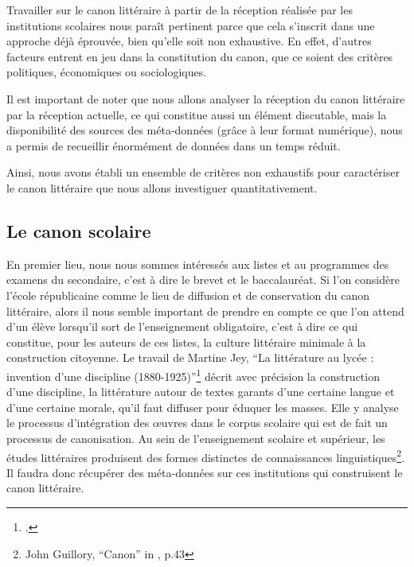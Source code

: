 Travailler sur le canon littéraire à partir de la réception réalisée par les institutions scolaires nous paraît pertinent parce que cela s'inscrit dans une approche déjà éprouvée, bien qu'elle soit non exhaustive. En effet, d'autres facteurs entrent en jeu dans la constitution du canon, que ce soient des critères politiques, économiques ou sociologiques.

Il est important de noter que nous allons analyser la réception du canon littéraire par la réception actuelle, ce qui constitue aussi un élément discutable, mais la disponibilité des sources des méta-données (grâce à leur format numérique), nous a permis de recueillir énormément de données dans un temps réduit. 

Ainsi, nous avons établi un ensemble de critères non exhaustifs pour caractériser le canon littéraire que nous allons investiguer quantitativement.

\subsection{Le canon scolaire}

En premier lieu, nous nous sommes intéressés aux listes et au programmes des examens du secondaire, c'est à dire le brevet et le baccalauréat. Si l'on considère l'école républicaine comme le lieu de diffusion et de conservation du canon littéraire, alors il nous semble important de prendre en compte ce que l'on attend d'un élève lorsqu'il sort de l'enseignement obligatoire, c'est à dire ce qui constitue, pour les auteurs de ces listes, la culture littéraire minimale à la construction citoyenne. Le travail de Martine Jey, \enquote{La littérature au lycée : invention d’une discipline (1880-1925)}\footcites{jey_litterature_1998} décrit avec précision la construction d'une discipline, la littérature autour de textes garants d'une certaine langue et d'une certaine morale, qu'il faut diffuser pour éduquer les masses. Elle y analyse le processus d'intégration des œuvres dans le corpus scolaire qui est de fait un processus de canonisation. Au sein de l'enseignement scolaire et supérieur, les études littéraires produisent des formes distinctes de connaissances linguistiques\footnote{John Guillory, \enquote{Canon} in \cite{lentricchia_critical_2012},  p.43}. Il faudra donc récupérer des méta-données sur ces institutions qui construisent le canon littéraire.


